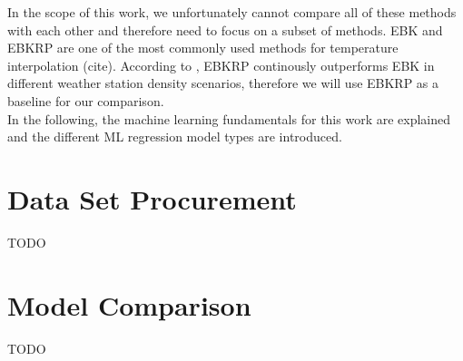 In the scope of this work, we unfortunately cannot compare all of these methods with each other and therefore need to focus on a subset of methods. EBK and EBKRP are one of the most commonly used methods for temperature interpolation (cite). According to \cite{njoku2023effects}, EBKRP continously outperforms EBK in different weather station density scenarios, therefore we will use EBKRP as a baseline for our comparison.\\
In the following, the machine learning fundamentals for this work are explained and the different ML regression model types are introduced.

\section{Data Set Procurement}

TODO

\section{Model Comparison}

TODO